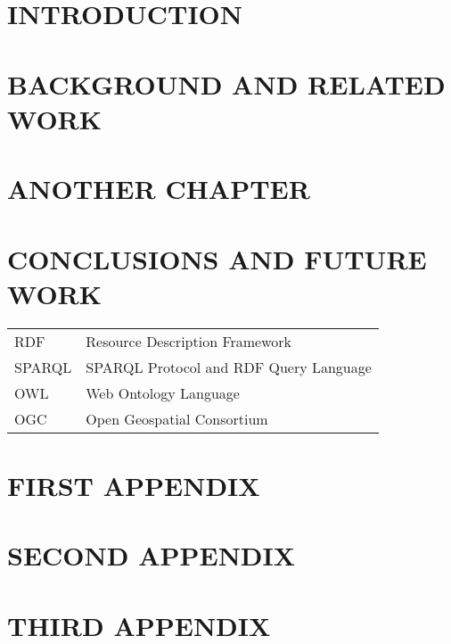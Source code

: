 \documentclass[inscr,ack,preface]{dithesis}
\begin{document}
\frontmatter

\mainmatter

\chapter{INTRODUCTION}
  \lipsum[5-10]

\chapter{BACKGROUND AND RELATED WORK}
\chapter{ANOTHER CHAPTER}
\chapter{CONCLUSIONS AND FUTURE WORK}

\backmatter

\abbreviations
\begin{center}
	\renewcommand{\arraystretch}{1.5}
	\begin{longtable}{ l @{\qquad} l }
	\toprule
	RDF    & Resource Description Framework \\
	SPARQL & SPARQL Protocol and RDF Query Language \\
	OWL    & Web Ontology Language \\
	OGC    & Open Geospatial Consortium \\
	\bottomrule
	\end{longtable}
\end{center}

\begin{appendix}
\appendixstartedtrue

{}

\chapter{FIRST APPENDIX}
\chapter{SECOND APPENDIX}
\chapter{THIRD APPENDIX}
\end{appendix}



\end{document}
